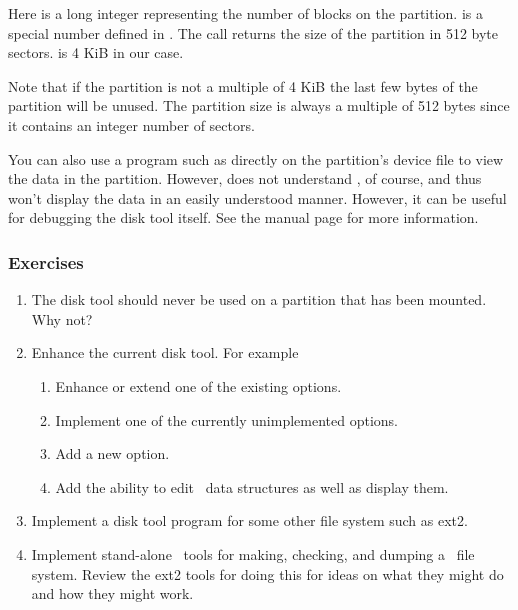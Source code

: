 Here  is a long integer representing the number of blocks on the partition.
 is a special number defined in . The  call
returns the size of the partition in 512 byte sectors.  is 4 KiB in our case.

Note that if the partition is not a multiple of 4 KiB the last few bytes of the partition will
be unused. The partition size is always a multiple of 512 bytes since it contains an integer
number of sectors.

You can also use a program such as  directly on the partition's device file to view
the data in the partition. However,  does not understand \GenericFS, of course, and
thus won't display the data in an easily understood manner. However, it can be useful for
debugging the disk tool itself. See the  manual page for more information.

\subsubsection*{Exercises}

\begin{enumerate}

\item The disk tool should never be used on a partition that has been mounted. Why not?

\item Enhance the current disk tool. For example

  \begin{enumerate}
    \item Enhance or extend one of the existing options.
    \item Implement one of the currently unimplemented options.
    \item Add a new option.
    \item Add the ability to edit \GenericFS\ data structures as well as
      display them.
  \end{enumerate}
  
\item Implement a disk tool program for some other file system such as ext2.

\item Implement stand-alone \GenericFS\ tools for making, checking, and dumping a \GenericFS\
  file system. Review the ext2 tools for doing this for ideas on what they might do and how they
  might work.

\end{enumerate}

